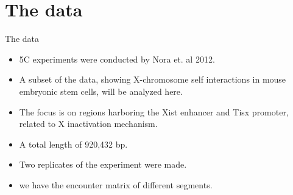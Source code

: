 \documentclass[8pt]{beamer}
\begin{document}
\section{The data}
\begin{frame}{The data}
\begin{itemize}
\item 5C experiments were conducted by Nora et. al 2012. 
\item A subset of the data, showing X-chromosome self interactions in mouse embryonic stem cells, will be analyzed here. 
\item The focus is on regions harboring the Xist enhancer and Tisx promoter, related to X inactivation mechanism. 
\item A total length of 920,432 bp.
\item Two replicates of the experiment were made. 
\item we have the encounter matrix of different segments.
\end{itemize}
\end{frame}
\end{document}
